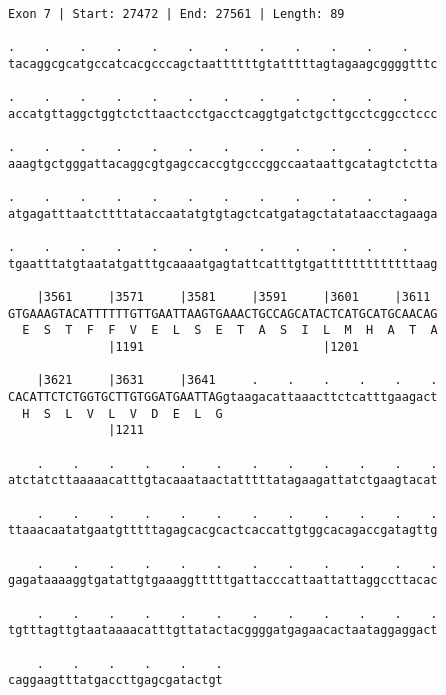 \documentclass{article}
\begin{document}
\begin{Verbatim}
Exon 7 | Start: 27472 | End: 27561 | Length: 89
 
.    .    .    .    .    .    .    .    .    .    .    .    
tacaggcgcatgccatcacgcccagctaattttttgtatttttagtagaagcggggtttc
  
.    .    .    .    .    .    .    .    .    .    .    .    
accatgttaggctggtctcttaactcctgacctcaggtgatctgcttgcctcggcctccc
  
.    .    .    .    .    .    .    .    .    .    .    .    
aaagtgctgggattacaggcgtgagccaccgtgcccggccaataattgcatagtctctta
  
.    .    .    .    .    .    .    .    .    .    .    .    
atgagatttaatcttttataccaatatgtgtagctcatgatagctatataacctagaaga
  
.    .    .    .    .    .    .    .    .    .    .    .    
tgaatttatgtaatatgatttgcaaaatgagtattcatttgtgatttttttttttttaag
  
    |3561     |3571     |3581     |3591     |3601     |3611 
GTGAAAGTACATTTTTTGTTGAATTAAGTGAAACTGCCAGCATACTCATGCATGCAACAG
  E  S  T  F  F  V  E  L  S  E  T  A  S  I  L  M  H  A  T  A
              |1191                         |1201           
  
    |3621     |3631     |3641     .    .    .    .    .    .
CACATTCTCTGGTGCTTGTGGATGAATTAGgtaagacattaaacttctcatttgaagact
  H  S  L  V  L  V  D  E  L  G                              
              |1211                                         
  
    .    .    .    .    .    .    .    .    .    .    .    .
atctatcttaaaaacatttgtacaaataactatttttatagaagattatctgaagtacat
  
    .    .    .    .    .    .    .    .    .    .    .    .
ttaaacaatatgaatgtttttagagcacgcactcaccattgtggcacagaccgatagttg
  
    .    .    .    .    .    .    .    .    .    .    .    .
gagataaaaggtgatattgtgaaaggtttttgattacccattaattattaggccttacac
  
    .    .    .    .    .    .    .    .    .    .    .    .
tgtttagttgtaataaaacatttgttatactacggggatgagaacactaataggaggact
  
    .    .    .    .    .    .
caggaagtttatgaccttgagcgatactgt
\end{Verbatim}
\newpage
\end{document}
